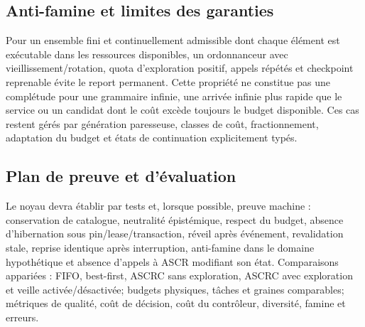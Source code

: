 \subsection{Anti-famine et limites des garanties}
Pour un ensemble fini et continuellement admissible dont chaque élément est exécutable dans les ressources disponibles, un ordonnanceur avec vieillissement/rotation, quota d'exploration positif, appels répétés et checkpoint reprenable évite le report permanent. Cette propriété ne constitue pas une complétude pour une grammaire infinie, une arrivée infinie plus rapide que le service ou un candidat dont le coût excède toujours le budget disponible. Ces cas restent gérés par génération paresseuse, classes de coût, fractionnement, adaptation du budget et états de continuation explicitement typés.

\subsection{Plan de preuve et d'évaluation}
Le noyau devra établir par tests et, lorsque possible, preuve machine : conservation de catalogue, neutralité épistémique, respect du budget, absence d'hibernation sous pin/lease/transaction, réveil après événement, revalidation stale, reprise identique après interruption, anti-famine dans le domaine hypothétique et absence d'appels à ASCR modifiant son état. Comparaisons appariées : FIFO, best-first, ASCRC sans exploration, ASCRC avec exploration et veille activée/désactivée; budgets physiques, tâches et graines comparables; métriques de qualité, coût de décision, coût du contrôleur, diversité, famine et erreurs.
